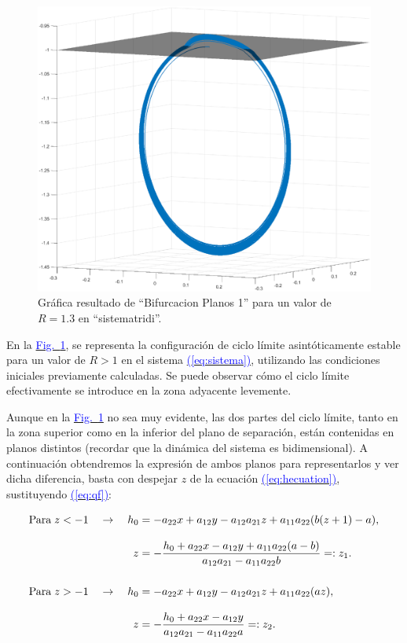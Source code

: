 \documentclass[12pt,a4paper]{report} %
\newcommand{\fref}[1]{\hyperref[#1]{\textcolor{blue}{Fig.~\ref*{#1}}}}
\newcommand{\eref}[1]{\hyperref[#1]{\textcolor{blue}{(\ref*{#1})}}}
\begin{document}
	\begin{figure}[h]
		\centering
		\includegraphics[width=1\textwidth]{ciclocir.eps}
		\caption{Gráfica resultado de ``Bifurcacion Planos 1'' para un valor de $R=1.3$ en ``sistematridi''.}
		\label{fig:ciclocircuito}
	\end{figure}\smallskip
	
		\vspace{0.5cm}\noindent En la \fref{fig:ciclocircuito}, se representa la configuración de ciclo límite asintóticamente estable para un valor de $R>1$ en el sistema \eref{eq:sistema}, utilizando las condiciones iniciales previamente calculadas. Se puede observar cómo el ciclo límite efectivamente se introduce en la zona adyacente levemente.
		
		\newpage
		
	Aunque en la \fref{fig:ciclocircuito} no sea muy evidente, las dos partes del ciclo límite, tanto en la zona superior como en la inferior del plano de separación, están contenidas en planos distintos (recordar que la dinámica del sistema es bidimensional). A continuación obtendremos la expresión de ambos planos para representarlos y ver dicha diferencia, basta con despejar $z$ de la ecuación \eref{eq:hecuation}, sustituyendo \eref{eq:qf}:
		
		\begin{subequations}
			\label{eq:funcz}
			\begin{align}
				\text{Para}\; z<-1 \quad \rightarrow \quad h_0&=-a_{22}x+a_{12}y-a_{12}a_{21}z+a_{11}a_{22}(b(z+1)-a),\notag\\[3mm]
				z&=-\frac{h_0+a_{22}x-a_{12}y+a_{11}a_{22}(a-b)}{a_{12}a_{21}-a_{11}a_{22}b}=:z_1. \label{eq:z1} \\[5mm]
				\text{Para}\; z>-1 \quad \rightarrow \quad h_0&=-a_{22}x+a_{12}y-a_{12}a_{21}z+a_{11}a_{22}(az),\notag\\[3mm]
				z&=-\frac{h_0+a_{22}x-a_{12}y}{a_{12}a_{21}-a_{11}a_{22}a}=:z_2. \label{eq:z2}
			\end{align}
		\end{subequations}
		
\end{document}

